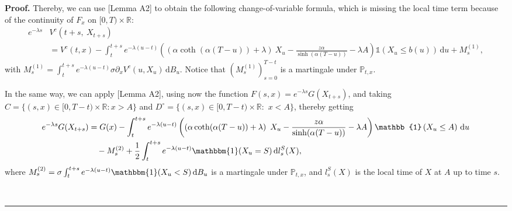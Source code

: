 \documentclass{tufte-handout}
\newenvironment{pf}[1][Proof]{\textbf{#1.} }{\ \rule{0.5em}{0.5em}}
\begin{document}
\begin{pf}
		Thereby, we can use \citet{d2020discounted}[Lemma A2] to obtain the following change-of-variable formula, which is missing the local time term because of the continuity of $F_x$ on $[0, T)\times\mathbb{R}$:
		\begin{align}
		e^{-\lambda s}&V^c(t + s,\ X_{t + s})\nonumber\\
		&= V^c(t, x) - \int_{t}^{t + s}e^{-\lambda(u - t)}\left(\left(\alpha\coth(\alpha(T - u)) + \lambda\right)\ X_{u} - \frac{z\alpha}{\sinh(\alpha(T - u))} - \lambda A \right)\mathbb{1}\left(X_{u}\leq b(u)\right)\,\mathrm{d}u + M_{s}^{(1)}, \label{eq:V^c_changed}
		\end{align}
		with $M_{s}^{(1)} = \int_{t}^{t + s}e^{-\lambda (u - t)}\sigma \partial_xV^{c}(u, X_{u})\,\mathrm{d}B_{u}$. Notice that $(M_{s}^{(1)})_{s = 0}^{T - t}$ is a martingale under $\mathbb{P}_{t, x}$.
		
		
		In the same way, we can apply \citet{d2020discounted}[Lemma A2], using now the function $F(s, x) = e^{-\lambda s}G(X_{t + s})$, and taking $C = \{(s, x) \in [0, T - t)\times\mathbb{R} : x > A\}$ and $D^{\circ} = \{(s, x) \in [0, T - t)\times\mathbb{R} :$ $ x < A\}$, thereby getting
		\begin{align}\label{eq:G_changed}
		e^{-\lambda s}G(X_{t+s}) &= G(x) - \int_{t}^{t + s}e^{-\lambda(u - t)}\left(\left(\alpha\coth(\alpha(T - u)) + \lambda\right)\ X_{u} - \frac{z\alpha}{\sinh(\alpha(T - u))} - \lambda A \right)\mathbb{1}\left(X_{u}\leq A\right)\,\mathrm{d}u \\
		&\ \ \ - M_{s}^{(2)} + \frac{1}{2}\int_t^{t + s}e^{-\lambda (u - t)}\mathbbm{1}(X_u = S)\,\mathrm{d}l_s^S(X), \nonumber
		\end{align}
		where $M_{s}^{(2)} = \sigma\int_{t}^{t + s}e^{-\lambda (u - t)}\mathbbm{1}(X_u < S)\,\mathrm{d}B_{u}$ is a martingale under $\mathbb{P}_{t, x}$, and $l_s^S(X)$ is the local time of $X$ at $A$ up to time $s$.
		
		

\end{pf}
\end{document}
